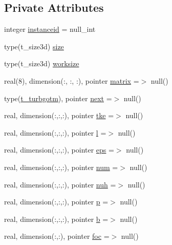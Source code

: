 \subsection*{Private Attributes}
\begin{DoxyCompactItemize}
\item 
integer \mbox{\hyperlink{structmoduleturbgotm_1_1t__turbgotm_aefd4bd094bf9510abe45256c2df3e2ab}{instanceid}} = null\+\_\+int
\item 
type(t\+\_\+size3d) \mbox{\hyperlink{structmoduleturbgotm_1_1t__turbgotm_a109b2877fa69e7e20389a3dc483297fd}{size}}
\item 
type(t\+\_\+size3d) \mbox{\hyperlink{structmoduleturbgotm_1_1t__turbgotm_afc7c7c147324d1e69cf1fb9a7f074447}{worksize}}
\item 
real(8), dimension(\+:, \+:, \+:), pointer \mbox{\hyperlink{structmoduleturbgotm_1_1t__turbgotm_abdf94072109764cbe99e660dfdcf3d37}{matrix}} =$>$ null()
\item 
type(\mbox{\hyperlink{structmoduleturbgotm_1_1t__turbgotm}{t\+\_\+turbgotm}}), pointer \mbox{\hyperlink{structmoduleturbgotm_1_1t__turbgotm_a89526353589ba1dd06bcf90b08ef162e}{next}} =$>$ null()
\item 
real, dimension(\+:,\+:,\+:), pointer \mbox{\hyperlink{structmoduleturbgotm_1_1t__turbgotm_ada9e3282787014694f50e281a68e9a49}{tke}} =$>$ null()
\item 
real, dimension(\+:,\+:,\+:), pointer \mbox{\hyperlink{structmoduleturbgotm_1_1t__turbgotm_a68550a0fc4bd02f88df618f515bde711}{l}} =$>$ null()
\item 
real, dimension(\+:,\+:,\+:), pointer \mbox{\hyperlink{structmoduleturbgotm_1_1t__turbgotm_af93521142974aee8adc85faf33a06580}{eps}} =$>$ null()
\item 
real, dimension(\+:,\+:,\+:), pointer \mbox{\hyperlink{structmoduleturbgotm_1_1t__turbgotm_ac94ccfec472020d62d02eb2aa4738cbd}{num}} =$>$ null()
\item 
real, dimension(\+:,\+:,\+:), pointer \mbox{\hyperlink{structmoduleturbgotm_1_1t__turbgotm_a09b0956eba24be2ee36c01d0f3658441}{nuh}} =$>$ null()
\item 
real, dimension(\+:,\+:,\+:), pointer \mbox{\hyperlink{structmoduleturbgotm_1_1t__turbgotm_a389c2dae16f379d0d75cae7a5d5ea9b0}{p}} =$>$ null()
\item 
real, dimension(\+:,\+:,\+:), pointer \mbox{\hyperlink{structmoduleturbgotm_1_1t__turbgotm_aa2143a10fa14294021526aff3a052e7d}{b}} =$>$ null()
\item 
real, dimension(\+:,\+:), pointer \mbox{\hyperlink{structmoduleturbgotm_1_1t__turbgotm_a3baf72b7f1ed62d8f867b7a15abf4e17}{foc}} =$>$ null()

\end{DoxyCompactItemize}

